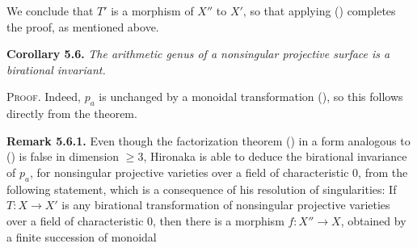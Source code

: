 {We conclude that $T'$ is a morphism of $X''$ to $X'$, so that applying () completes the proof, as mentioned above.

\medskip
\noindent\hypertarget{result-V-5.6}{}\textbf{Corollary 5.6.} \emph{The arithmetic genus of a nonsingular projective surface is a birational invariant.}

\smallskip
\noindent\textsc{Proof.} Indeed, $p_a$ is unchanged by a monoidal transformation (), so this follows directly from the theorem.

\medskip
\noindent\hypertarget{result-V-5.6.1}{}\textbf{Remark 5.6.1.} Even though the factorization theorem () in a form analogous to () is false in dimension $\ge3$, Hironaka  is able to deduce the birational invariance of $p_a$, for nonsingular projective varieties over a field of characteristic $0$, from the following statement, which is a consequence of his resolution of singularities: If $T\colon X\to X'$ is any birational transformation of nonsingular projective varieties over a field of characteristic $0$, then there is a morphism $f\colon X''\to X$, obtained by a finite succession of monoidal}
